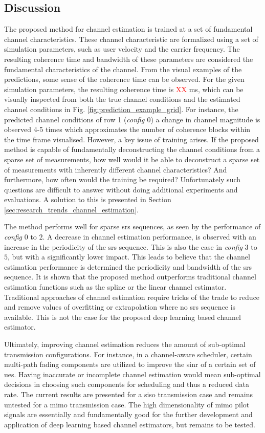 \subsection{Discussion}
The proposed method for channel estimation is trained at a set of fundamental channel characteristics. These channel characteristic are formalized using a set of simulation parameters, such as user velocity and the carrier frequency. The resulting coherence time and bandwidth of these parameters are considered the fundamental characteristics of the channel. From the visual examples of the predictions, some sense of the coherence time can be observed. For the given simulation parameters, the resulting coherence time is \textcolor{red}{XX} ms, which can be visually inspected from both the true channel conditions and the estimated channel conditions in Fig. \ref{fig:prediction_example_grid}. For instance, the predicted channel conditions of row 1 (\emph{config $0$}) a change in channel magnitude is observed 4-5 times which approximates the number of coherence blocks within the time frame visualised. However, a key issue of training arises. If the proposed method is capable of fundamentally deconstructing the channel conditions from a sparse set of measurements, how well would it be able to deconstruct a sparse set of measurements with inherently different channel characteristics? And furthermore, how often would the training be required? Unfortunately such questions are difficult to answer without doing additional experiments and evaluations. A solution to this is presented in Section \ref{sec:research_trends_channel_estimation}.

The method performs well for sparse \gls{srs} sequences, as seen by the performance of \emph{config} $0$ to $2$. A decrease in channel estimation performance, is observed with an increase in the periodicity of the \gls{srs} sequence.  This is also the case in \emph{config} $3$ to $5$, but with a significantly lower impact. This leads to believe that the channel estimation performance is determined the periodicity and bandwidth of the \gls{srs} sequence. It is shown that the proposed method outperforms traditional channel estimation functions such as the spline or the linear channel estimator. Traditional approaches of channel estimation require tricks of the trade to reduce and remove values of overfitting or extrapolation where no \gls{srs} sequence is available. This is not the case for the proposed deep learning based channel estimator.

Ultimately, improving channel estimation reduces the amount of sub-optimal transmission configurations. For instance, in a channel-aware scheduler, certain multi-path fading components are utilized to improve the \gls{sinr} of a certain set of \glspl{ue}. Having inaccurate or incomplete channel estimation would mean sub-optimal decisions in choosing such components for scheduling and thus a reduced data rate. The current results are presented for a \gls{siso} transmission case and remains untested for a \gls{mimo} transmission case. The high dimensionality of \gls{mimo} pilot signals are essentially and fundamentally good for the further development and application of deep learning based channel estimators, but remains to be tested. 

